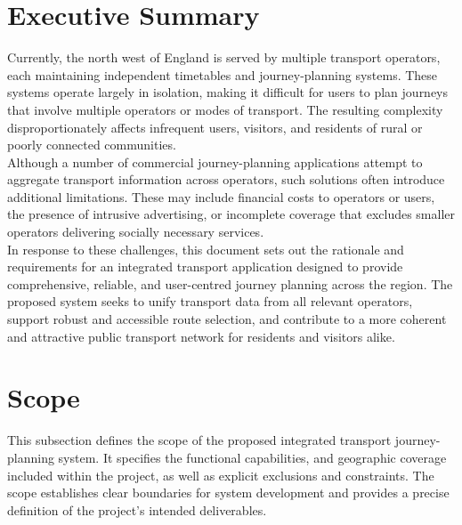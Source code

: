 \documentclass{article}
\begin{document}
\tableofcontents
\newpage


\section{Executive Summary}
Currently, the north west of England is served by multiple transport operators, each maintaining independent timetables and journey-planning systems. These systems operate largely in isolation, making it difficult for users to plan journeys that involve multiple operators or modes of transport. The resulting complexity disproportionately affects infrequent users, visitors, and residents of rural or poorly connected communities. \\

Although a number of commercial journey-planning applications attempt to aggregate transport information across operators, such solutions often introduce additional limitations. These may include financial costs to operators or users, the presence of intrusive advertising, or incomplete coverage that excludes smaller operators delivering socially necessary services. \\

In response to these challenges, this document sets out the rationale and requirements for an integrated transport application designed to provide comprehensive, reliable, and user-centred journey planning across the region. The proposed system seeks to unify transport data from all relevant operators, support robust and accessible route selection, and contribute to a more coherent and attractive public transport network for residents and visitors alike.


\section{Scope}
This subsection defines the scope of the proposed integrated transport journey-planning system. It specifies the functional capabilities, and geographic coverage included within the project, as well as explicit exclusions and constraints. The scope establishes clear boundaries for system development and provides a precise definition of the project’s intended deliverables.
\end{document}
